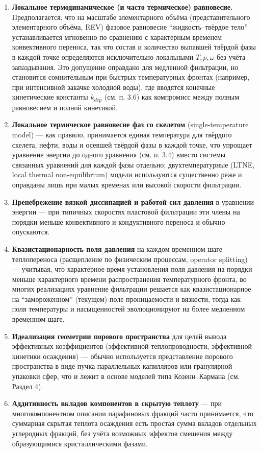 \documentclass[11pt]{extarticle}
\providecommand{\tightlist}{\setlength{\itemsep}{0pt}\setlength{\parskip}{0pt}}
\begin{document}
\begin{enumerate}
\def\labelenumi{\arabic{enumi}.}
\tightlist
\item
  \textbf{Локальное термодинамическое (и часто термическое) равновесие.} Предполагается, что на масштабе элементарного объёма (представительного элементарного объёма, REV) фазовое равновесие ``жидкость--твёрдое тело'' устанавливается мгновенно по сравнению с характерным временем конвективного переноса, так что состав и количество выпавшей твёрдой фазы в каждой точке определяются исключительно локальными \(T, p, \omega\) без учёта запаздывания. Это допущение оправдано для медленной фильтрации, но становится сомнительным при быстрых температурных фронтах (например, при интенсивной закачке холодной воды), где вводятся конечные кинетические константы \(k_{dep}\) (см. п. 3.6) как компромисс между полным равновесием и полной кинетикой.
\item
  \textbf{Локальное термическое равновесие фаз со скелетом} (single-temperature model) --- как правило, принимается единая температура для твёрдого скелета, нефти, воды и осевшей твёрдой фазы в каждой точке, что упрощает уравнение энергии до одного уравнения (см. п. 3.4) вместо системы связанных уравнений для каждой фазы отдельно; двухтемпературные (LTNE, local thermal non-equilibrium) модели используются существенно реже и оправданы лишь при малых временах или высокой скорости фильтрации.
\item
  \textbf{Пренебрежение вязкой диссипацией и работой сил давления} в уравнении энергии --- при типичных скоростях пластовой фильтрации эти члены на порядки меньше конвективного и кондуктивного переноса и обычно опускаются.
\item
  \textbf{Квазистационарность поля давления} на каждом временном шаге теплопереноса (расщепление по физическим процессам, operator splitting) --- учитывая, что характерное время установления поля давления на порядки меньше характерного времени распространения температурного фронта, во многих реализациях уравнение фильтрации решается как квазистационарное на ``замороженном'' (текущем) поле проницаемости и вязкости, тогда как поля температуры и насыщенностей эволюционируют на более медленном временном шаге.
\item
  \textbf{Идеализация геометрии порового пространства} для целей вывода эффективных коэффициентов (эффективной теплопроводности, эффективной кинетики осаждения) --- обычно используется представление порового пространства в виде пучка параллельных капилляров или гранулярной упаковки сфер, что и лежит в основе моделей типа Козени--Кармана (см. Раздел 4).
\item
  \textbf{Аддитивность вкладов компонентов в скрытую теплоту} --- при многокомпонентном описании парафиновых фракций часто принимается, что суммарная скрытая теплота осаждения есть простая сумма вкладов отдельных углеродных фракций, без учёта возможных эффектов смешения между образующимися кристаллическими фазами.
\end{enumerate}
\end{document}
